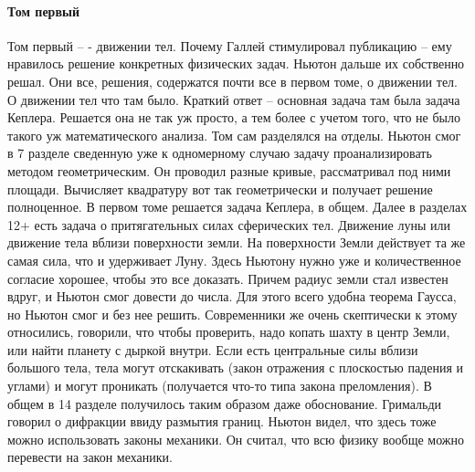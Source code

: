 \documentclass[a4paper, 12pt]{article}
\begin{document}
\paragraph{Том первый}
Том первый -- - движении тел. Почему Галлей стимулировал публикацию -- 
ему нравилось решение конкретных физических задач. Ньютон дальше их 
собственно решал. Они все, решения, содержатся почти все в первом томе, 
о движении тел. О движении тел что там было. Краткий ответ -- основная 
задача там была задача Кеплера. Решается она не так уж просто, а тем 
более с учетом того, что не было такого уж математического анализа. Том 
сам разделялся на отделы. Ньютон смог в 7 разделе сведенную уже 
к одномерному случаю задачу проанализировать методом геометрическим. Он 
проводил разные кривые, рассматривал под ними площади. Вычисляет 
квадратуру вот так геометрически и получает решение полноценное. 
В первом томе решается задача Кеплера, в общем. Далее в разделах 12+ 
есть задача о притягательных силах сферических тел. Движение луны или 
движение тела вблизи поверхности земли. На поверхности Земли действует 
та же самая сила, что и удерживает Луну. Здесь Ньютону нужно уже 
и количественное согласие хорошее, чтобы это все доказать. Причем радиус 
земли стал известен вдруг, и Ньютон смог довести до числа. Для этого 
всего удобна теорема Гаусса, но Ньютон смог и без нее решить. 
Современники же очень скептически к этому относились, говорили, что 
чтобы проверить, надо копать шахту в центр Земли, или найти планету 
с дыркой внутри. Если есть центральные силы вблизи большого тела, тела 
могут отскакивать (закон отражения с плоскостью падения и углами) 
и могут проникать (получается что-то типа закона преломления). В общем 
в 14 разделе получилось таким образом даже обоснование. Гримальди 
говорил о дифракции ввиду размытия границ. Ньютон видел, что здесь тоже 
можно использовать законы механики. Он считал, что всю физику вообще 
можно перевести на закон механики.
\end{document}
